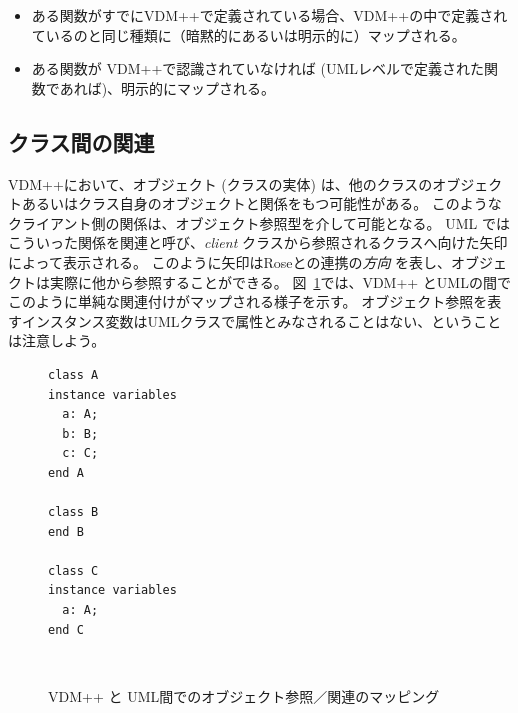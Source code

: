 \documentclass[\pformat,12pt]{jarticle}
\newcommand{\vdmpp}{VDM++}
\newcommand{\link}{Roseとの連携}
\begin{document}
\begin{itemize}
\item ある関数がすでに\vdmpp{}で定義されている場合、\vdmpp{}の中で定義されているのと同じ種類に（暗黙的にあるいは明示的に）マップされる。
\item ある関数が \vdmpp{}で認識されていなければ (UMLレベルで定義された関数であれば)、明示的にマップされる。
\end{itemize}

\subsection{クラス間の関連} \label{assoclasses}
  
 \vdmpp{}において、オブジェクト (クラスの実体) は、他のクラスのオブジェクトあるいはクラス自身のオブジェクトと関係をもつ可能性がある。
このようなクライアント側の関係は、オブジェクト参照型を介して可能となる。
UML ではこういった関係を関連と呼び、{\it client} クラスから参照されるクラスへ向けた矢印によって表示される。
このように矢印は\link{}の{\it 方向} を表し、オブジェクトは実際に他から参照することができる。
図~\ref{fig:classA}では、\vdmpp{} とUMLの間でこのように単純な関連付けがマップされる様子を示す。
オブジェクト参照を表すインスタンス変数はUMLクラスで属性とみなされることはない、ということは注意しよう。

\begin{figure}[htb]
\begin{center}
\hspace{-2cm}
\begin{minipage}[t]{2in}
\begin{verbatim}
class A  
instance variables  
  a: A;  
  b: B;  
  c: C;  
end A  
  
class B  
end B  
  
class C  
instance variables  
  a: A;  
end C  
\end{verbatim}
\end{minipage} \ \
\begin{minipage}[t]{2in}
\vspace{1cm}
\end{minipage}
\caption{\vdmpp{} と UML間でのオブジェクト参照／関連のマッピング　\label{fig:classA}}
\end{center}
\end{figure}
\end{document}

